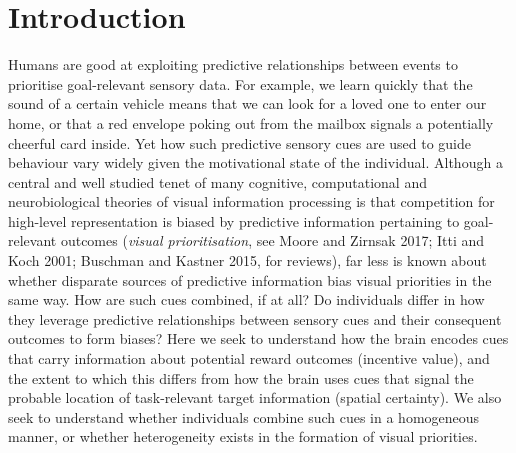 \documentclass[11pt,halfline,a4paper,]{ouparticle}
\begin{document}
\hypertarget{introduction}{%
\section{Introduction}\label{introduction}}

\label{sec:Intro}

Humans are good at exploiting predictive relationships between events to prioritise goal-relevant sensory data. For example, we learn quickly that the sound of a certain vehicle means that we can look for a loved one to enter our home, or that a red envelope poking out from the mailbox signals a potentially cheerful card inside. Yet how such predictive sensory cues are used to guide behaviour vary widely given the motivational state of the individual. Although a central and well studied tenet of many cognitive, computational and neurobiological theories of visual information processing is that competition for high-level representation is biased by predictive information pertaining to goal-relevant outcomes (\emph{visual prioritisation}, see Moore and Zirnsak 2017; Itti and Koch 2001; Buschman and Kastner 2015, for reviews), far less is known about whether disparate sources of predictive information bias visual priorities in the same way. How are such cues combined, if at all? Do individuals differ in how they leverage predictive relationships between sensory cues and their consequent outcomes to form biases? Here we seek to understand how the brain encodes cues that carry information about potential reward outcomes (incentive value), and the extent to which this differs from how the brain uses cues that signal the probable location of task-relevant target information (spatial certainty). We also seek to understand whether individuals combine such cues in a homogeneous manner, or whether heterogeneity exists in the formation of visual priorities.
\end{document}
